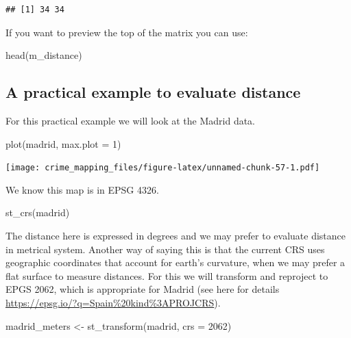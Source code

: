\documentclass[
]{book}
\newenvironment{Shaded}{\begin{snugshade}}{\end{snugshade}}
\newcommand{\AttributeTok}[1]{\textcolor[rgb]{0.77,0.63,0.00}{#1}}
\newcommand{\DecValTok}[1]{\textcolor[rgb]{0.00,0.00,0.81}{#1}}
\newcommand{\FunctionTok}[1]{\textcolor[rgb]{0.00,0.00,0.00}{#1}}
\newcommand{\NormalTok}[1]{#1}
\newcommand{\OtherTok}[1]{\textcolor[rgb]{0.56,0.35,0.01}{#1}}
\begin{document}
\begin{verbatim}
## [1] 34 34
\end{verbatim}

If you want to preview the top of the matrix you can use:

\begin{Shaded}
\begin{Highlighting}[]
\FunctionTok{head}\NormalTok{(m\_distance)}
\end{Highlighting}
\end{Shaded}

\hypertarget{a-practical-example-to-evaluate-distance}{%
\subsection{A practical example to evaluate distance}\label{a-practical-example-to-evaluate-distance}}

For this practical example we will look at the Madrid data.

\begin{Shaded}
\begin{Highlighting}[]
\FunctionTok{plot}\NormalTok{(madrid, }\AttributeTok{max.plot =} \DecValTok{1}\NormalTok{)}
\end{Highlighting}
\end{Shaded}

\texttt{[image: crime\_mapping\_files/figure-latex/unnamed-chunk-57-1.pdf]}

We know this map is in EPSG 4326.

\begin{Shaded}
\begin{Highlighting}[]
\FunctionTok{st\_crs}\NormalTok{(madrid)}
\end{Highlighting}
\end{Shaded}

The distance here is expressed in degrees and we may prefer to evaluate distance in metrical system. Another way of saying this is that the current CRS uses geographic coordinates that account for earth's curvature, when we may prefer a flat surface to measure distances. For this we will transform and reproject to EPGS 2062, which is appropriate for Madrid (see here for details \url{https://epsg.io/?q=Spain\%20kind\%3APROJCRS}).

\begin{Shaded}
\begin{Highlighting}[]
\NormalTok{madrid\_meters }\OtherTok{\textless{}{-}} \FunctionTok{st\_transform}\NormalTok{(madrid, }\AttributeTok{crs =} \DecValTok{2062}\NormalTok{)}
\end{Highlighting}
\end{Shaded}
\end{document}
